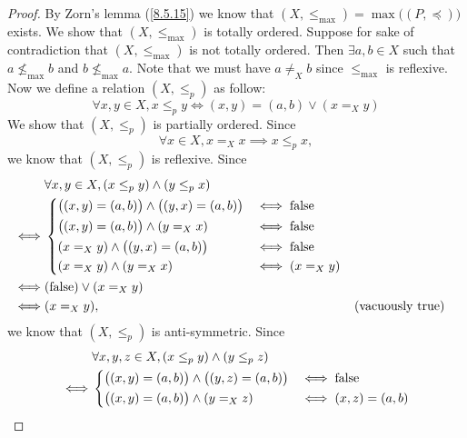 \begin{proof}
  By Zorn's lemma (\cref{8.5.15}) we know that \((X, \leq_{\max}) = \max\big((P, \preceq)\big)\) exists.
  We show that \((X, \leq_{\max})\) is totally ordered.
  Suppose for sake of contradiction that \((X, \leq_{\max})\) is not totally ordered.
  Then \(\exists a, b \in X\) such that \(a \not\leq_{\max} b\) and \(b \not\leq_{\max} a\).
  Note that we must have \(a \neq_X b\) since \(\leq_{\max}\) is reflexive.
  Now we define a relation \((X, \leq_p)\) as follow:
  \[
    \forall x, y \in X, x \leq_p y \iff (x, y) = (a, b) \lor (x =_X y)
  \]
  We show that \((X, \leq_p)\) is partially ordered.
  Since
  \[
    \forall x \in X, x =_X x \implies x \leq_p x,
  \]
  we know that \((X, \leq_p)\) is reflexive.
  Since
  \begin{align*}
         & \forall x, y \in X, (x \leq_p y) \land (y \leq_p x)                                                           \\
    \iff & \begin{dcases}
             \big((x, y) = (a, b)\big) \land \big((y, x) = (a, b)\big) & \iff \text{false} \\
             \big((x, y) = (a, b)\big) \land (y =_X x)                 & \iff \text{false} \\
             (x =_X y) \land \big((y, x) = (a, b)\big)                 & \iff \text{false} \\
             (x =_X y) \land (y =_X x)                                 & \iff (x =_X y)
           \end{dcases}                                 \\
    \iff & (\text{false}) \lor (x =_X y)                                                                                 \\
    \iff & (x =_X y),                                                                       &  & \text{(vacuously true)}
  \end{align*}
  we know that \((X, \leq_p)\) is anti-symmetric.
  Since
  \begin{align*}
         & \forall x, y, z \in X, (x \leq_p y) \land (y \leq_p z)                                                           \\
    \iff & \begin{dcases}
             \big((x, y) = (a, b)\big) \land \big((y, z) = (a, b)\big) & \iff \text{false}    \\
             \big((x, y) = (a, b)\big) \land (y =_X z)                 & \iff (x, z) = (a, b) \\

\end{dcases}
\end{align*}
\end{proof}
